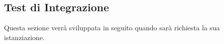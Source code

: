 \subsection{Test di Integrazione}
Questa sezione verrà sviluppata in seguito quando sarà richiesta la sua istanziazione.
